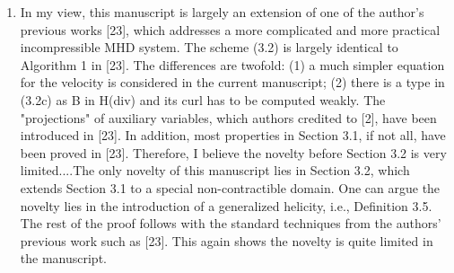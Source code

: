 \documentclass{article}
\theoremstyle{definition}
\newcommand{\rv}[1]{%
  \colorbox{gray!20}{%
    \parbox{0.96\linewidth}{%
      \small #1
    }%
  }%
}
\begin{document}
\begin{enumerate}
    \item \rv{ In my view, this manuscript is largely an extension of one of the author's previous works [23], which addresses a more complicated and more practical incompressible MHD system. The scheme (3.2) is largely identical to Algorithm 1 in [23]. The differences are twofold: (1) a much simpler equation for the velocity is considered in the current manuscript; (2) there is a type in (3.2c) as B in H(div) and its curl has to be computed weakly. The "projections" of auxiliary variables, which authors credited to [2], have been introduced in [23]. In addition, most properties in Section 3.1, if not all, have been proved in [23]. Therefore, I believe the novelty before Section 3.2 is very limited....The only novelty of this manuscript lies in Section 3.2, which extends Section 3.1 to a special non-contractible domain. One can argue the novelty lies in the introduction of a generalized helicity, i.e., Definition 3.5. The rest of the proof follows with the standard techniques from the authors' previous work such as [23]. This again shows the novelty is quite limited in the manuscript.}


\end{enumerate}
\end{document}
